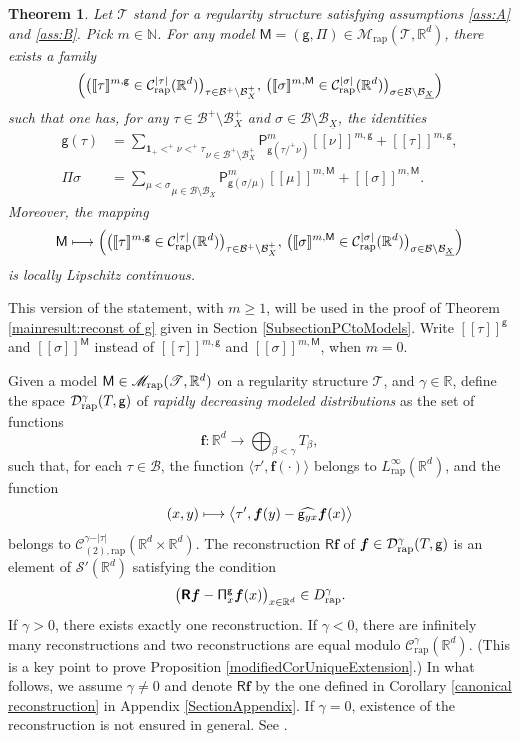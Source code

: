 \documentclass[11pt]{article}
\numberwithin{equation}{section}
\newcommand\mto{\mathchoice{\longmapsto}{\mapsto}{\mapsto}{\mapsto}}
\theoremstyle{plain}
\newtheorem{thm}{Theorem}
\theoremstyle{definition}
\newcommand{\unit}{\mathbf{1}}
\newcommand{\Brac}[1]{[\![#1]\!]}
\newcommand{\bsf}{\boldsymbol{f}}
\newcommand{\rap}{\mathrm{rap}}
\newcommand{\reR}{\boldsymbol{\mathsf{R}}}
\newcommand{\sfM}{\mathsf{M}}
\newcommand{\sfP}{\mathsf{P}}
\newcommand{\sfg}{\mathsf{g}}
\newcommand{\sfPi}{\mathsf{\Pi}}
\newcommand{\scrM}{\mathscr{M}}
\newcommand{\scrT}{\mathscr{T}}
\newcommand{\bbN}{\mathbb{N}}
\newcommand{\bbR}{\mathbb{R}}
\newcommand{\mcB}{\mathcal{B}}
\newcommand{\mcC}{\mathcal{C}}
\newcommand{\mcD}{\mathcal{D}}
\newcommand\mcS{\mathcal{S}}
\begin{document}
\begin{thm}\label{PropDefnBracket}
Let $\scrT$ stand for a regularity structure satisfying assumptions \eqref{ass:A} and \eqref{ass:B}. Pick $m\in\bbN$. For any model $\sfM=(\sfg,\sfPi)\in\scrM_\rap(\scrT,\bbR^d)$, there exists a family
\[
\Bigl(\bigl(\Brac{\tau}^{m,\sfg}\in \mcC^{\vert\tau\vert}_\rap(\bbR^d)\bigr)_{\tau\in\mcB^+\setminus\mcB_X^+}, \, \bigl(\Brac{\sigma}^{m,\sfM}\in \mcC^{\vert\sigma\vert}_\rap(\bbR^d)\bigr)_{\sigma\in\mcB\setminus \mcB_{\underline{X}}} \Bigr)
\]
such that one has, for any $\tau\in\mcB^+\setminus\mcB_X^+$ and $\sigma\in\mcB\setminus \mcB_{\underline{X}}$, the identities
\begin{align}
\label{def:bracket g}
\sfg(\tau) &= \underset{\nu\in\mcB^+\setminus\mcB_X^+}{\sum_{\unit_+<^+\nu<^+\tau}} \sfP^m_{\sfg(\tau/^+\nu)}\Brac{\nu}^{m,\sfg} + \Brac{\tau}^{m,\sfg}, \\
\label{def:bracket Pi}
\sfPi\sigma &= \underset{\mu\in\mcB\setminus \mcB_{\underline{X}}}{\sum_{\mu<\sigma}} \sfP^m_{\sfg(\sigma/\mu)}\Brac{\mu}^{m,\sfM} + \Brac{\sigma}^{m,\sfM}.
\end{align}
Moreover, the mapping
\[
\sfM \mto \Bigl(\bigl(\Brac{\tau}^{m,\sfg}\in \mcC^{\vert\tau\vert}_\rap(\bbR^d)\bigr)_{\tau\in\mcB^+\setminus\mcB_X^+}, \, \bigl(\Brac{\sigma}^{m,\sfM}\in \mcC^{\vert\sigma\vert}_\rap(\bbR^d)\bigr)_{\sigma\in\mcB\setminus \mcB_{\underline{X}}} \Bigr)
\]
is locally Lipschitz continuous.
\end{thm}

This version of the statement, with $m\geq 1$, will be used in the proof of Theorem \ref{mainresult:reconst of g} given in Section \ref{SubsectionPCtoModels}. Write $\Brac{\tau}^\sfg$ and $\Brac{\sigma}^\sfM$ instead of $\Brac{\tau}^{m,\sfg}$ and $\Brac{\sigma}^{m,\sfM}$, when $m=0$.

Given a model ${\sf M}\in\scrM_\rap(\scrT,\bbR^d)$ on a regularity structure $\scrT$, and $\gamma\in\bbR$, define the space $\mcD^\gamma_\rap(T,\sf g)$ of \emph{rapidly decreasing modeled distributions} as the set of functions
\[
{\bsf} : \bbR^d\to\bigoplus_{\beta<\gamma} T_\beta,
\]
such that, for each $\tau\in\mcB$, the function $\langle\tau',{\bsf}(\cdot)\rangle$ belongs to $L^\infty_\rap(\bbR^d)$, and the function
\[
(x,y) \mto \big\langle\tau',{\bsf}(y) - \widehat{{\sf g}_{yx}}\bsf(x)\big\rangle
\]
belongs to $\mcC^{\gamma-\vert\tau\vert}_{(2),\rap}(\bbR^d\times\bbR^d)$. The reconstruction $\reR\bsf$ of $\bsf\in\mcD_{\rap}^\gamma(T,{\sf g})$ is an element of $\mcS'(\bbR^d)$ satisfying the condition
\[
\bigl(\reR\bsf - {\sf \Pi}^{\sfg}_x\bsf(x)\bigr)_{x\in\bbR^d}\in D^\gamma_\rap.
\]
If $\gamma>0$, there exists exactly one reconstruction. If $\gamma<0$, there are infinitely many reconstructions and two reconstructions are equal modulo $\mcC_{\rap}^\gamma(\bbR^d)$. (This is a key point to prove Proposition \ref{modifiedCorUniqueExtension}.) In what follows, we assume $\gamma\neq0$ and denote $\reR\bsf$ by the one defined in Corollary \ref{canonical reconstruction} in Appendix \ref{SectionAppendix}. If $\gamma=0$, existence of the reconstruction is not ensured in general. See \cite[Ex.\,5.5]{CZ}.
\end{document}
